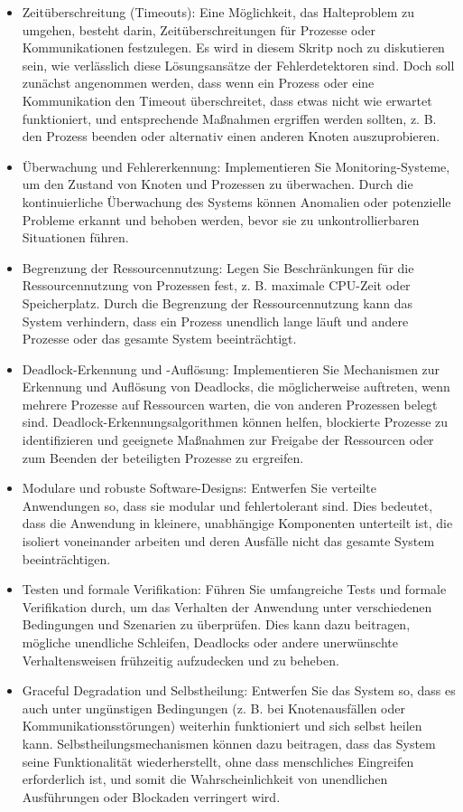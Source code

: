 \begin{itemize}
\item Zeitüberschreitung (Timeouts): Eine Möglichkeit, das Halteproblem zu umgehen, besteht darin, Zeitüberschreitungen für Prozesse oder Kommunikationen festzulegen. Es wird in diesem Skritp noch zu diskutieren sein, wie verlässlich diese Lösungsansätze der Fehlerdetektoren sind. Doch soll zunächst angenommen werden, dass wenn ein Prozess oder eine Kommunikation den Timeout überschreitet, dass etwas nicht wie erwartet funktioniert, und entsprechende Maßnahmen ergriffen werden sollten, z. B. den Prozess beenden oder alternativ einen anderen Knoten auszuprobieren.
\item Überwachung und Fehlererkennung: Implementieren Sie Monitoring-Systeme, um den Zustand von Knoten und Prozessen zu überwachen. Durch die kontinuierliche Überwachung des Systems können Anomalien oder potenzielle Probleme erkannt und behoben werden, bevor sie zu unkontrollierbaren Situationen führen.
\item Begrenzung der Ressourcennutzung: Legen Sie Beschränkungen für die Ressourcennutzung von Prozessen fest, z. B. maximale CPU-Zeit oder Speicherplatz. Durch die Begrenzung der Ressourcennutzung kann das System verhindern, dass ein Prozess unendlich lange läuft und andere Prozesse oder das gesamte System beeinträchtigt.
\item Deadlock-Erkennung und -Auflösung: Implementieren Sie Mechanismen zur Erkennung und Auflösung von Deadlocks, die möglicherweise auftreten, wenn mehrere Prozesse auf Ressourcen warten, die von anderen Prozessen belegt sind. Deadlock-Erkennungsalgorithmen können helfen, blockierte Prozesse zu identifizieren und geeignete Maßnahmen zur Freigabe der Ressourcen oder zum Beenden der beteiligten Prozesse zu ergreifen.
\item Modulare und robuste Software-Designs: Entwerfen Sie verteilte Anwendungen so, dass sie modular und fehlertolerant sind. Dies bedeutet, dass die Anwendung in kleinere, unabhängige Komponenten unterteilt ist, die isoliert voneinander arbeiten und deren Ausfälle nicht das gesamte System beeinträchtigen.
\item Testen und formale Verifikation: Führen Sie umfangreiche Tests und formale Verifikation durch, um das Verhalten der Anwendung unter verschiedenen Bedingungen und Szenarien zu überprüfen. Dies kann dazu beitragen, mögliche unendliche Schleifen, Deadlocks oder andere unerwünschte Verhaltensweisen frühzeitig aufzudecken und zu beheben.
\item Graceful Degradation und Selbstheilung: Entwerfen Sie das System so, dass es auch unter ungünstigen Bedingungen (z. B. bei Knotenausfällen oder Kommunikationsstörungen) weiterhin funktioniert und sich selbst heilen kann. Selbstheilungsmechanismen können dazu beitragen, dass das System seine Funktionalität wiederherstellt, ohne dass menschliches Eingreifen erforderlich ist, und somit die Wahrscheinlichkeit von unendlichen Ausführungen oder Blockaden verringert wird.
\end{itemize}
